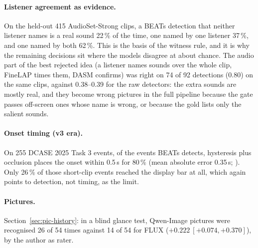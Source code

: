 \paragraph{Listener agreement as evidence.} On the held-out 415 AudioSet-Strong clips, a BEATs detection that neither
listener names is a real sound 22\,\% of the time, one named by one listener 37\,\%, and one named by both 62\,\%. This is
the basis of the witness rule, and it is why the remaining decisions sit where the models disagree at about chance.
The audio part of the best rejected idea (a listener names sounds over the whole clip, FineLAP times them, DASM
confirms) was right on 74 of 92 detections (0.80) on the same clips, against 0.38--0.39 for the raw detectors: the
extra sounds are mostly real, and they become wrong pictures in the full pipeline because the gate passes off-screen
ones whose name is wrong, or because the gold lists only the salient sounds.

\paragraph{Onset timing (v3 era).} On 255 DCASE 2025 Task 3 events, of the events BEATs detects, hysteresis plus
occlusion places the onset within 0.5\,s for 80\,\% (mean absolute error 0.35\,s; ).
Only 26\,\% of those short-clip events reached the display bar at all, which again points to detection, not timing,
as the limit.

\paragraph{Pictures.} Section~\ref{sec:pic-history}: in a blind glance test, Qwen-Image pictures were recognised 26 of
54 times against 14 of 54 for FLUX ($+0.222\ [+0.074, +0.370]$), by the author as rater.

